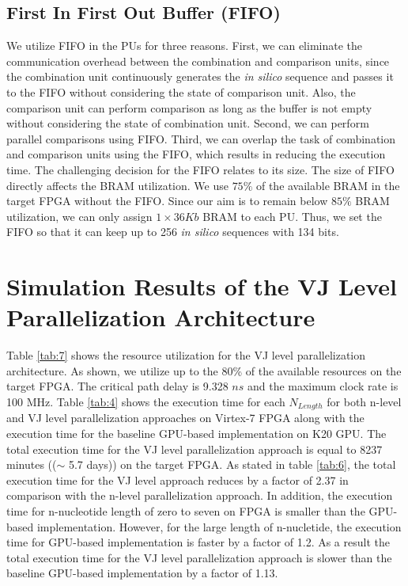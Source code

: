 \subsection{First In First Out Buffer (FIFO)} \label{subsec:FIFO}
We utilize FIFO in the PUs for three reasons. First, we can eliminate the communication overhead between the combination and comparison units, since the combination unit continuously generates the \emph{in silico} sequence and passes it to the FIFO without considering the state of comparison unit. Also, the comparison unit can perform comparison as long as the buffer is not empty without considering the state of combination unit. 
Second, we can perform parallel comparisons using FIFO. Third, we can overlap the task of combination and comparison units using the FIFO, which results in reducing the execution time.
The challenging decision for the FIFO relates to its size. The size of FIFO directly affects the BRAM utilization. We use $75\%$ of the available BRAM in the target FPGA without the FIFO. Since our aim is to remain below $85\%$ BRAM utilization, we can only assign $1 \times 36Kb$ BRAM to each PU. Thus, we set the FIFO so that it can keep up to 256 \emph{in silico} sequences with 134 bits.   


\section{Simulation Results of the VJ Level Parallelization Architecture} \label{sec:simVJlevel}

Table \ref{tab:7} shows the resource utilization for the VJ level parallelization architecture. As shown, we utilize up to the 80\% of the available resources on the target FPGA. The critical path delay is 9.328  $ns$ and the maximum clock rate is 100 MHz. Table \ref{tab:4} shows the execution time for each $N_{Length}$ for both n-level and VJ level parallelization approaches on Virtex-7 FPGA along with the execution time for the baseline GPU-based implementation on K20 GPU. The total execution time for the VJ level parallelization approach is equal to 8237 minutes (($\sim$ 5.7 days)) on the target FPGA. As stated in table \ref{tab:6}, the total execution time for the VJ level approach reduces by a factor of 2.37 in comparison with the n-level parallelization approach. In addition, the execution time for n-nucleotide length of zero to seven on FPGA is smaller than the GPU-based implementation. However, for the large length of n-nucletide, the execution time for GPU-based implementation is faster by a factor of 1.2. As a result the total execution time for the VJ level parallelization approach is slower than the baseline GPU-based implementation by a factor of 1.13.   

